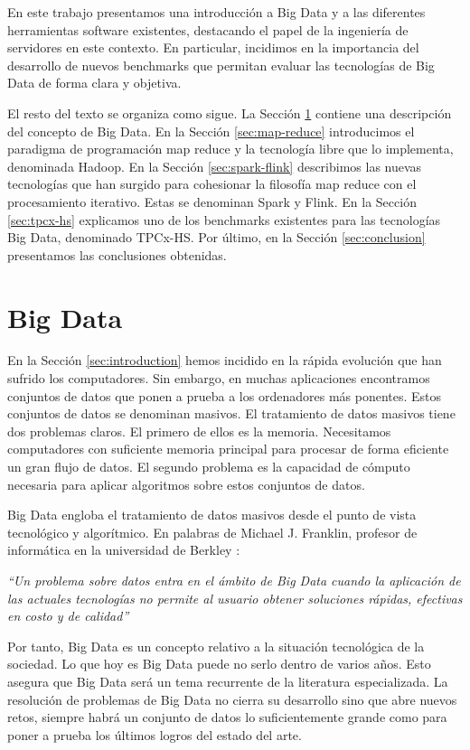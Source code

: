\documentclass[10pt]{article}
\begin{document}
	En este trabajo presentamos una introducción a Big Data y a las diferentes herramientas software existentes, destacando el papel de la ingeniería de servidores en este contexto. En particular, incidimos en la importancia del desarrollo de nuevos benchmarks que permitan evaluar las tecnologías de Big Data de forma clara y objetiva.

	El resto del texto se organiza como sigue. La Sección \ref{sec:big-data} contiene una descripción del concepto de Big Data. En la Sección \ref{sec:map-reduce} introducimos el paradigma de programación map reduce y la tecnología libre que lo implementa, denominada Hadoop. En la Sección \ref{sec:spark-flink} describimos las nuevas tecnologías que han surgido para cohesionar la filosofía map reduce con el procesamiento iterativo. Estas se denominan Spark y Flink. En la Sección \ref{sec:tpcx-hs} explicamos uno de los benchmarks existentes para las tecnologías Big Data, denominado TPCx-HS. Por último, en la Sección \ref{sec:conclusion} presentamos las conclusiones obtenidas.

\section{Big Data} \label{sec:big-data}
	
	En la Sección \ref{sec:introduction} hemos incidido en la rápida evolución que han sufrido los computadores. Sin embargo, en muchas aplicaciones encontramos conjuntos de datos que ponen a prueba a los ordenadores más ponentes. Estos conjuntos de datos se denominan masivos. El tratamiento de datos masivos tiene dos problemas claros. El primero de ellos es la memoria. Necesitamos computadores con suficiente memoria principal para procesar de forma eficiente un gran flujo de datos. El segundo problema es la capacidad de cómputo necesaria para aplicar algoritmos sobre estos conjuntos de datos. 
	
	Big Data engloba el tratamiento de datos masivos desde el punto de vista tecnológico y algorítmico. En palabras de Michael J. Franklin, profesor de informática en la universidad de Berkley \cite{bd-definition}:
	
	\textit{``Un problema sobre datos entra en el ámbito de Big Data cuando la aplicación de las actuales tecnologías no permite al usuario obtener soluciones  rápidas, efectivas en costo y de calidad''}

	Por tanto, Big Data es un concepto relativo a la situación tecnológica de la sociedad. Lo que hoy es Big Data puede no serlo dentro de varios años. Esto asegura que Big Data será un tema recurrente de la literatura especializada. La resolución de problemas de Big Data no cierra su desarrollo sino que abre nuevos retos, siempre habrá un conjunto de datos lo suficientemente grande como para poner a prueba los últimos logros del estado del arte.
\end{document}

